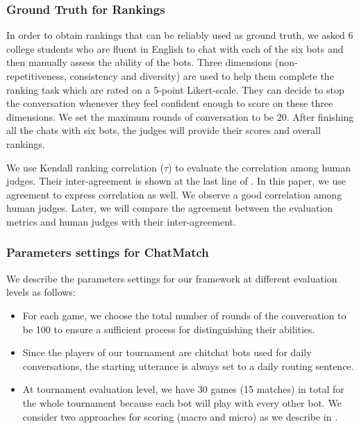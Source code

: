 \subsubsection*{Ground Truth for Rankings}
 In order to obtain rankings that can be reliably used as ground truth, 
we asked 6 college students who are fluent in English to chat 
with each of the six bots and then manually assess the ability of 
the bots. Three dimensions (non-repetitiveness, consistency and 
diversity) are used to help them complete the ranking task 
which are rated on a 5-point Likert-scale. They can decide to 
stop the conversation whenever they feel confident enough to score
on these three dimensions. We set the maximum rounds of conversation 
to be 20. After finishing all the chats with six bots,  
the judges will provide their scores and overall rankings.

We use Kendall ranking correlation ($\tau$)  to evaluate the correlation 
among human judges. Their inter-agreement is shown at the last line of . In this paper, we use agreement to express correlation as well. We observe a good correlation among human judges. Later, we will compare the agreement between the evaluation metrics and human judges with their inter-agreement.  


\subsubsection*{Parameters settings for ChatMatch}

We describe the parameters settings for our framework
at different evaluation levels as follows: 
\begin{itemize}
\item  For each game, we choose the total number of rounds of the conversation to be 100 to ensure a sufficient process for distinguishing their abilities.
\item  Since the players of our tournament are chitchat bots used 
for daily conversations, the starting utterance is always set to
a daily routing sentence.
\item  At tournament evaluation level, we have 30 games (15 matches) 
in total for the whole tournament because each bot will play with
every other bot. We consider two approaches for scoring 
(macro and micro) as we describe in .
\end{itemize}


